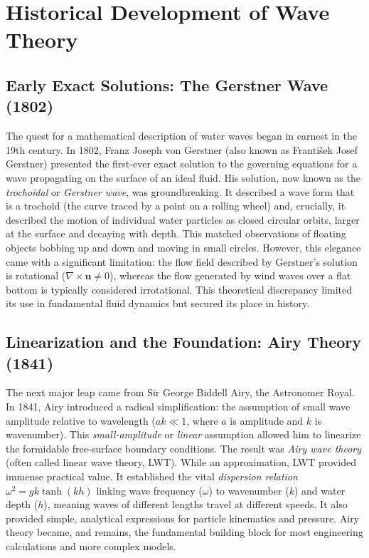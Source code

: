 \documentclass[11pt,letterpaper]{article}
\begin{document}
\section{Historical Development of Wave Theory}
\subsection{Early Exact Solutions: The Gerstner Wave (1802)}
The quest for a mathematical description of water waves began in earnest in the 19th century. In 1802, Franz Joseph von Gerstner (also known as František Josef Gerstner) presented the first-ever exact solution to the governing equations for a wave propagating on the surface of an ideal fluid. His solution, now known as the \emph{trochoidal} or \emph{Gerstner wave}, was groundbreaking. It described a wave form that is a trochoid (the curve traced by a point on a rolling wheel) and, crucially, it described the motion of individual water particles as closed circular orbits, larger at the surface and decaying with depth. This matched observations of floating objects bobbing up and down and moving in small circles. However, this elegance came with a significant limitation: the flow field described by Gerstner's solution is rotational ($\nabla \times \mathbf{u} \neq 0$), whereas the flow generated by wind waves over a flat bottom is typically considered irrotational. This theoretical discrepancy limited its use in fundamental fluid dynamics but secured its place in history.

\subsection{Linearization and the Foundation: Airy Theory (1841)}
The next major leap came from Sir George Biddell Airy, the Astronomer Royal. In 1841, Airy introduced a radical simplification: the assumption of small wave amplitude relative to wavelength ($ak \ll 1$, where $a$ is amplitude and $k$ is wavenumber). This \emph{small-amplitude} or \emph{linear} assumption allowed him to linearize the formidable free-surface boundary conditions. The result was \emph{Airy wave theory} (often called linear wave theory, LWT). While an approximation, LWT provided immense practical value. It established the vital \emph{dispersion relation} $\omega^2 = gk \tanh(kh)$ linking wave frequency ($\omega$) to wavenumber ($k$) and water depth ($h$), meaning waves of different lengths travel at different speeds. It also provided simple, analytical expressions for particle kinematics and pressure. Airy theory became, and remains, the fundamental building block for most engineering calculations and more complex models.
\end{document}
